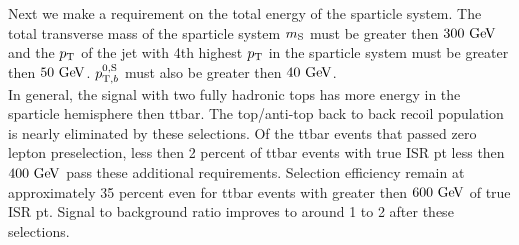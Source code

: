 \indent Next we make a requirement on the total energy of the sparticle system.  The total transverse mass of the sparticle system $m_{\mathrm{S}}$ must be greater then $300 \gev$ and the $p_{\mathrm{T}}$ of the jet with 4th highest $p_{\mathrm{T}}$ in the sparticle system must be greater then $50 \gev$.  $p_{\mathrm{T},b}^{0,\mathrm{S}}$ must also be greater then $40 \gev$.   \\

\indent In general, the signal with two fully hadronic tops has more energy in the sparticle hemisphere then ttbar.  The top/anti-top back to back recoil population is nearly eliminated by these selections.  Of the ttbar events that passed zero lepton preselection, less then 2 percent of ttbar events with true ISR pt less then $400 \gev$ pass these additional requirements.     Selection efficiency remain at approximately 35 percent even for ttbar events with greater then $600 \gev$ of true ISR pt.  Signal to background ratio improves to around 1 to 2 after these selections. \\


